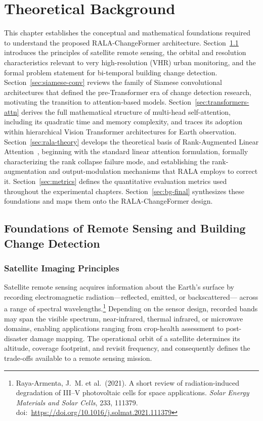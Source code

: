 \chapter{Theoretical Background}
\label{chap:background}

This chapter establishes the conceptual and mathematical foundations required
to understand the proposed RALA-ChangeFormer architecture. Section~\ref{sec:sat-imagery}
introduces the principles of satellite remote sensing, the orbital and resolution
characteristics relevant to very high-resolution (VHR) urban monitoring, and the
formal problem statement for bi-temporal building change detection.
Section~\ref{sec:siamese-conv} reviews the family of Siamese convolutional
architectures that defined the pre-Transformer era of change detection research,
motivating the transition to attention-based models.
Section~\ref{sec:transformers-attn} derives the full mathematical structure of
multi-head self-attention, including its quadratic time and memory complexity, and
traces its adoption within hierarchical Vision Transformer architectures for Earth
observation. Section~\ref{sec:rala-theory} develops the theoretical basis of
Rank-Augmented Linear Attention~\cite{Fan2025RALA}, beginning with the standard
linear attention formulation, formally characterizing the rank collapse failure mode,
and establishing the rank-augmentation and output-modulation mechanisms that RALA
employs to correct it. Section~\ref{sec:metrics} defines the quantitative evaluation
metrics used throughout the experimental chapters. Section~\ref{sec:bg-final}
synthesizes these foundations and maps them onto the RALA-ChangeFormer design.


\section{Foundations of Remote Sensing and Building Change Detection}
\label{sec:sat-imagery}

\subsection{Satellite Imaging Principles}

Satellite remote sensing acquires information about the Earth's surface by
recording electromagnetic radiation---reflected, emitted, or backscattered---
across a range of spectral wavelengths.\footnote{Raya-Armenta, J.~M. et al.\
(2021). A short review of radiation-induced degradation of {III--V}
photovoltaic cells for space applications. \textit{Solar Energy Materials and
Solar Cells}, 233, 111379.
doi:~\url{https://doi.org/10.1016/j.solmat.2021.111379}}
Depending on the sensor design, recorded bands may span the visible spectrum,
near-infrared, thermal infrared, or microwave domains, enabling applications
ranging from crop-health assessment to post-disaster damage mapping.
The operational orbit of a satellite determines its altitude, coverage footprint,
and revisit frequency, and consequently defines the trade-offs available to a
remote sensing mission.

